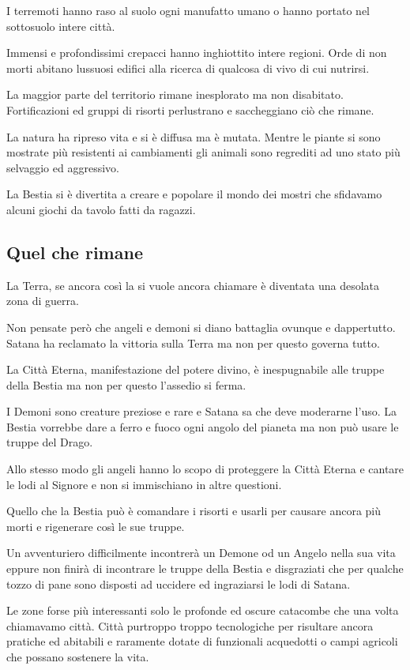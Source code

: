 \documentclass[12pt,a4paper,twoside,openany]{book}
\begin{document}
\begin{multicols}{2}
I terremoti hanno raso al suolo ogni manufatto umano o hanno portato nel sottosuolo intere città.

Immensi e profondissimi crepacci hanno inghiottito intere regioni. Orde di non morti abitano lussuosi edifici alla ricerca di qualcosa di vivo di cui nutrirsi.

La maggior parte del territorio rimane inesplorato ma non disabitato. Fortificazioni ed gruppi di risorti perlustrano e saccheggiano ciò che rimane.

La natura ha ripreso vita e si è diffusa ma è mutata. Mentre le piante si sono mostrate più resistenti ai cambiamenti gli animali sono regrediti ad uno stato più selvaggio ed aggressivo.

La Bestia si è divertita a creare e popolare il mondo dei mostri che sfidavamo alcuni giochi da tavolo fatti da ragazzi.

\subsection{Quel che rimane}

La Terra, se ancora così la si vuole ancora chiamare è diventata una desolata zona di guerra.

Non pensate però che angeli e demoni si diano battaglia ovunque e dappertutto. Satana ha reclamato la vittoria sulla Terra ma non per questo governa tutto.

La Città Eterna, manifestazione del potere divino, è inespugnabile alle truppe della Bestia ma non per questo l'assedio si ferma.

I Demoni sono creature preziose e rare e Satana sa che deve moderarne l'uso. La Bestia vorrebbe dare a ferro e fuoco ogni angolo del pianeta ma non può usare le truppe del Drago.

Allo stesso modo gli angeli hanno lo scopo di proteggere la Città Eterna e cantare le lodi al Signore e non si immischiano in altre questioni.

Quello che la Bestia può è comandare i risorti e usarli per causare ancora più morti e rigenerare così le sue truppe.

Un avventuriero difficilmente incontrerà un Demone od un Angelo nella sua vita eppure non finirà di incontrare le truppe della Bestia e disgraziati che per qualche tozzo di pane sono disposti ad uccidere ed ingraziarsi le lodi di Satana.

Le zone forse più interessanti solo le profonde ed oscure catacombe che una volta chiamavamo città.
Città purtroppo troppo tecnologiche per risultare ancora pratiche ed abitabili e raramente dotate di funzionali acquedotti o campi agricoli che possano sostenere la vita.


\end{multicols}
\end{document}
